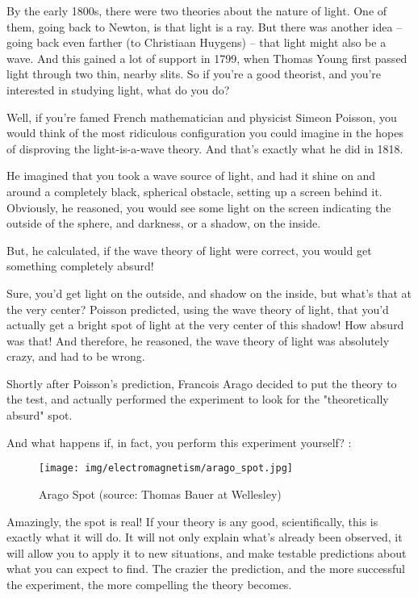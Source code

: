 	By the early 1800s, there were two theories about the nature of light. One of them, going back to Newton, is that light is a ray. But there was another idea – going back even farther (to Christiaan Huygens) – that light might also be a wave. And this gained a lot of support in 1799, when Thomas Young first passed light through two thin, nearby slits. So if you're a good theorist, and you're interested in studying light, what do you do?
	
	Well, if you're famed French mathematician and physicist Simeon Poisson, you would think of the most ridiculous configuration you could imagine in the hopes of disproving the light-is-a-wave theory. And that's exactly what he did in 1818.

	He imagined that you took a wave source of light, and had it shine on and around a completely black, spherical obstacle, setting up a screen behind it. Obviously, he reasoned, you would see some light on the screen indicating the outside of the sphere, and darkness, or a shadow, on the inside.

	But, he calculated, if the wave theory of light were correct, you would get something completely absurd!

	Sure, you'd get light on the outside, and shadow on the inside, but what's that at the very center? Poisson predicted, using the wave theory of light, that you'd actually get a bright spot of light at the very center of this shadow! How absurd was that! And therefore, he reasoned, the wave theory of light was absolutely crazy, and had to be wrong.

	Shortly after Poisson's prediction, Francois Arago decided to put the theory to the test, and actually performed the experiment to look for the "theoretically absurd" spot.

	And what happens if, in fact, you perform this experiment yourself? :
	\begin{figure}[H]
		\centering
		\texttt{[image: img/electromagnetism/arago\_spot.jpg]}
		\caption[Arago Spot]{Arago Spot (source: Thomas Bauer at Wellesley)}
	\end{figure}

	Amazingly, the spot is real! If your theory is any good, scientifically, this is exactly what it will do. It will not only explain what's already been observed, it will allow you to apply it to new situations, and make testable predictions about what you can expect to find. The crazier the prediction, and the more successful the experiment, the more compelling the theory becomes.
	
